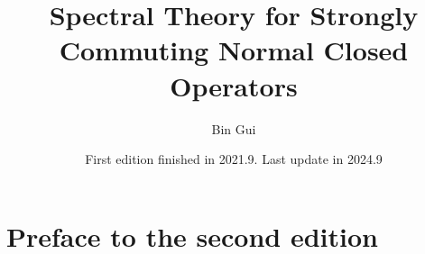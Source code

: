 \documentclass[12pt,b5paper,notitlepage]{article}
\title{Spectral Theory for Strongly Commuting Normal Closed Operators}
\author{{\sc Bin Gui}
}
\date{\footnotesize First edition finished in  2021.9. Last update in 2024.9}
\theoremstyle{definition}
\theoremstyle{plain}
\numberwithin{equation}{section}
\begin{document}
\sloppy %
	
	
	
	\maketitle
	
	
\newcommand\blfootnote[1]{%
	\begingroup
	\renewcommand\thefootnote{}\footnote{#1}%
	\addtocounter{footnote}{-1}%
	\endgroup
}

\vspace{-0.5cm}








\makeatletter
\newcommand*{\toccontents}{}
\makeatother
\toccontents



	
	
	
	

	
	

	
	
	
	
	
	
	
	
	

	
\newpage

\section*{Preface to the second edition}
\end{document}
